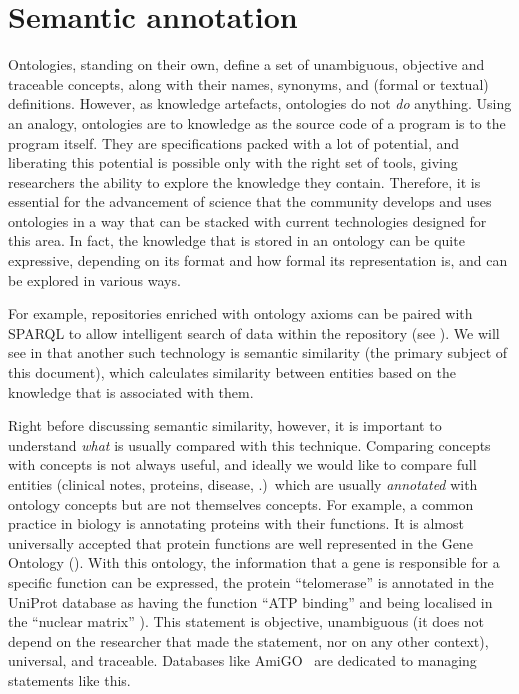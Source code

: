 \section{Semantic annotation} \label{sec:concepts/semantic-annotation}

Ontologies, standing on their own, define a set of unambiguous, objective and traceable concepts, along with their names, synonyms, and (formal or textual) definitions. However, as knowledge artefacts, ontologies do not \emph{do} anything. Using an analogy, ontologies are to knowledge as the source code of a program is to the program itself. They are specifications packed with a lot of potential, and liberating this potential is possible only with the right set of tools, giving researchers the ability to explore the knowledge they contain. Therefore, it is essential for the advancement of science that the community develops and uses ontologies in a way that can be stacked with current technologies designed for this area. In fact, the knowledge that is stored in an ontology can be quite expressive, depending on its format and how formal its representation is, and can be explored in various ways.

For example, repositories enriched with ontology axioms can be paired with SPARQL to allow intelligent search of data within the repository (see ). We will see in  that another such technology is semantic similarity (the primary subject of this document), which calculates similarity between entities based on the knowledge that is associated with them.

Right before discussing semantic similarity, however, it is important to understand \emph{what} is usually compared with this technique. Comparing concepts with concepts is not always useful, and ideally we would like to compare full entities (clinical notes, proteins, disease, \etc.)\ which are usually \emph{annotated} with ontology concepts but are not themselves concepts. For example, a common practice in biology is annotating proteins with their functions. It is almost universally accepted that protein functions are well represented in the Gene Ontology (). With this ontology, the information that a gene is responsible for a specific function can be expressed, \eg the protein ``telomerase''  is annotated in the UniProt database as having the function ``ATP binding''  and being localised in the ``nuclear matrix'' ). This statement is objective, unambiguous (\ie it does not depend on the researcher that made the statement, nor on any other context), universal, and traceable. Databases like AmiGO~\citep{Carbon2009} are dedicated to managing statements like this.

